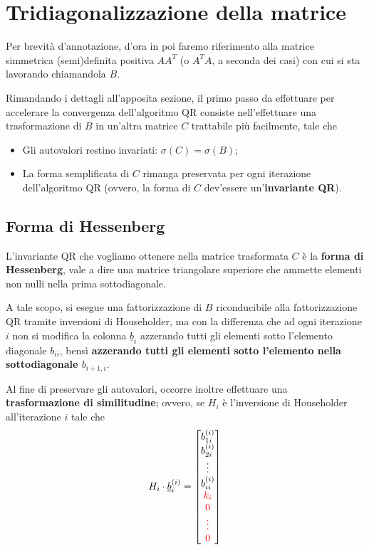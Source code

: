 \section{Tridiagonalizzazione della matrice}
Per brevità d'annotazione, d'ora in poi faremo riferimento alla matrice 
simmetrica (semi)definita positiva $A A^T$ (o $A^T A$, a seconda dei casi) con 
cui si sta lavorando chiamandola $B$.

Rimandando i dettagli all'apposita sezione, il primo passo da effettuare per 
accelerare la convergenza dell'algoritmo QR consiste nell'effettuare una 
trasformazione di $B$ in un'altra matrice $C$ trattabile più facilmente, tale 
che
\begin{itemize}
	\item Gli autovalori restino invariati: $\sigma(C) = \sigma(B)$;
	
	\item La forma semplificata di $C$ rimanga preservata per ogni iterazione 
dell'algoritmo QR (ovvero, la forma di $C$ dev'essere un'\textbf{invariante 
QR}).
\end{itemize}

\subsection{Forma di Hessenberg}
L'invariante QR che vogliamo ottenere nella matrice trasformata $C$ è la 
\textbf{forma di Hessenberg}, vale a dire una matrice triangolare superiore che 
ammette elementi non nulli nella prima sottodiagonale.

A tale scopo, si esegue una fattorizzazione di $B$ riconducibile alla 
fattorizzazione QR tramite inversioni di Householder, ma con la differenza che 
ad ogni iterazione $i$ non si modifica la colonna $\underline{b}_i$ azzerando 
tutti gli elementi sotto l'elemento diagonale $b_{ii}$, bensì \textbf{azzerando 
tutti gli elementi sotto l'elemento nella sottodiagonale $b_{i+1,i}$}.

Al fine di preservare gli autovalori, occorre inoltre effettuare una 
\textbf{trasformazione di similitudine}; ovvero, se $H_i$ è l'inversione di 
Householder all'iterazione $i$ tale che
\begin{equation}\label{householder_iteration}
H_i \cdot \underline{b}_{i}^{(i)} = 
\begin{bmatrix}
	b_{1i}^{(i)} \\
	b_{2i}^{(i)} \\
	\vdots \\
	b_{ii}^{(i)} \\ 
	\textcolor{red}{k_i} \\
	\textcolor{red}{0} \\ 
	\textcolor{red}{\vdots} \\ 
	\textcolor{red}{0}
\end{bmatrix}
\end{equation}

